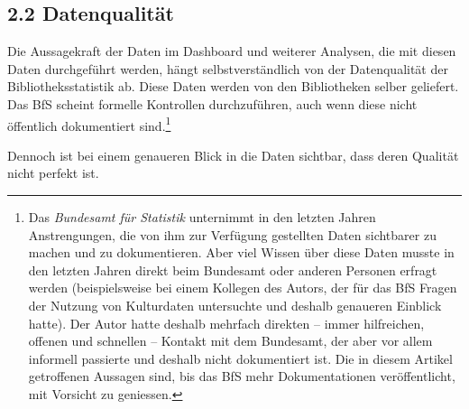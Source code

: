 \documentclass[a4paper,
fontsize=11pt,
oneside,
numbers=noperiodatend,
parskip=half-,
bibliography=totoc,
final
]{scrartcl}
\begin{document}
\subsection{2.2 Datenqualität}\label{datenqualituxe4t}

Die Aussagekraft der Daten im Dashboard und weiterer Analysen, die mit
diesen Daten durchgeführt werden, hängt selbstverständlich von der
Datenqualität der Bibliotheksstatistik ab. Diese Daten werden von den
Bibliotheken selber geliefert. Das BfS scheint formelle Kontrollen
durchzuführen, auch wenn diese nicht öffentlich dokumentiert
sind.\footnote{Das \emph{Bundesamt für Statistik} unternimmt in den
  letzten Jahren Anstrengungen, die von ihm zur Verfügung gestellten
  Daten sichtbarer zu machen und zu dokumentieren. Aber viel Wissen über
  diese Daten musste in den letzten Jahren direkt beim Bundesamt oder
  anderen Personen erfragt werden (beispielsweise bei einem Kollegen des
  Autors, der für das BfS Fragen der Nutzung von Kulturdaten untersuchte
  und deshalb genaueren Einblick hatte). Der Autor hatte deshalb
  mehrfach direkten -- immer hilfreichen, offenen und schnellen --
  Kontakt mit dem Bundesamt, der aber vor allem informell passierte und
  deshalb nicht dokumentiert ist. Die in diesem Artikel getroffenen
  Aussagen sind, bis das BfS mehr Dokumentationen veröffentlicht, mit
  Vorsicht zu geniessen.}

Dennoch ist bei einem genaueren Blick in die Daten sichtbar, dass deren
Qualität nicht perfekt ist.
\end{document}
